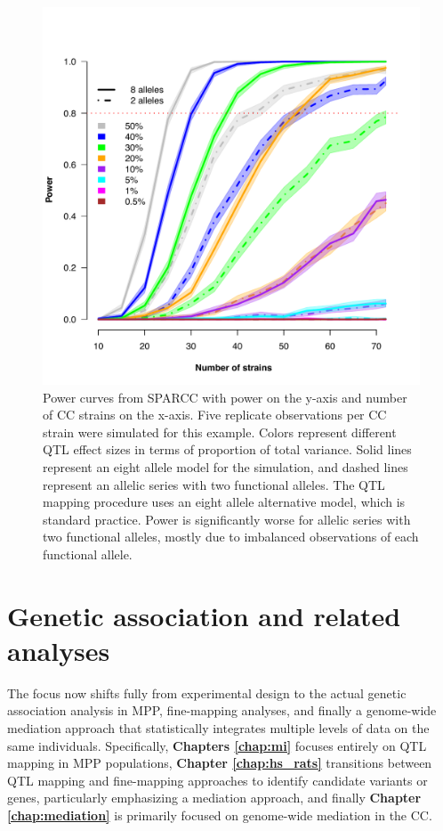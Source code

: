 \begin{figure}
\centering
\includegraphics[width=\textwidth, trim={0in 0in 0in 0.1in}, clip]{figures/1-introduction/sparcc_diss_intro.pdf}
\caption[SPARCC power curves comparing eight and two allele models]{Power curves from SPARCC with power on the y-axis and number of CC strains on the x-axis. Five replicate observations per CC strain were simulated for this example. Colors represent different QTL effect sizes in terms of proportion of total variance. Solid lines represent an eight allele model for the simulation, and dashed lines represent an allelic series with two functional alleles. The QTL mapping procedure uses an eight allele alternative model, which is standard practice. Power is significantly worse for allelic series with two functional alleles, mostly due to imbalanced observations of each functional allele. \label{fig:intro_sparcc_example}}
\end{figure}

\section{Genetic association and related analyses}

The focus now shifts fully from experimental design to the actual genetic association analysis in MPP, fine-mapping analyses, and finally a genome-wide mediation approach that statistically integrates multiple levels of data on the same individuals. Specifically, \textbf{Chapters \ref{chap:mi}} focuses entirely on QTL mapping in MPP populations, \textbf{Chapter \ref{chap:hs_rats}} transitions between QTL mapping and fine-mapping approaches to identify candidate variants or genes, particularly emphasizing a mediation approach, and finally \textbf{Chapter \ref{chap:mediation}} is primarily focused on genome-wide mediation in the CC.

